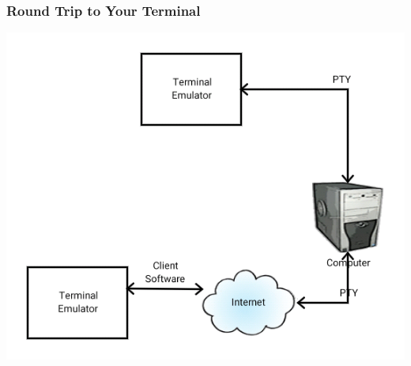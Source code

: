\documentclass[handout]{beamer}
\begin{document}
\begin{frame}
    \frametitle{Round Trip to Your Terminal}
    \begin{center}
        \includegraphics[height=0.8\textheight]{images/ttymodern}
    \end{center}
\end{frame}
\end{document}
